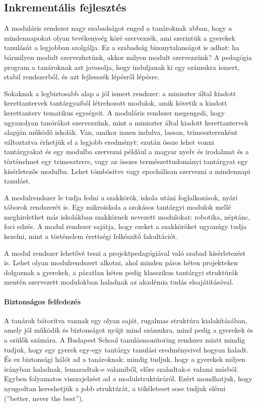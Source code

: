 \subsection{Inkrementális fejlesztés}
A moduláris rendszer nagy szabadságot enged a tanároknak abban, hogy a mindennapokat olyan tevékenység köré szervezzék, ami szerintük a gyerekek tanulását a legjobban szolgálja. Ez a szabadság bizonytalanságot is adhat: ha bármilyen modult szervezhetünk, akkor milyen modult szervezzünk? A pedagógia program a tanároknak azt javasolja, hogy induljanak ki egy számukra ismert, stabil rendszerből, és azt fejlesszék lépésről lépésre.

Sokaknak a legbiztosabb alap a jól ismert rendszer: a miniszter által kiadott kerettantervek tantárgyaiból létrehozott modulok, amik követik a kiadott kerettanterv tematikus egységeit. A moduláris rendszer megengedi, hogy ugyanolyan tanórákat szervezzünk, mint a miniszter által kiadott kerettantervek alapján működő iskolák. Van, amikor innen indulva, lassan, trimeszterenként változtatva érhetjük el a legjobb eredményt: ezután össze lehet vonni tantárgyakat és egy modulba szervezni például a magyar nyelv és irodalmat és a történelmet egy trimeszterre, vagy az összes természettudományi tantárgyat egy kísérletezős modulba. Lehet tömbösítve vagy epochálisan szervezni a mindennapi tanulást.

A modulrendszer le tudja fedni a szakkörök, iskola utáni foglalkozások, nyári táborok rendszerét is. Egy mikroiskola a szokásos tantárgyi modulok mellé meghirdethet más iskolákban szakkörnek nevezett modulokat: robotika, néptánc, foci edzés. A modul rendszer sajátja, hogy ezeket a szakköröket ugyanúgy tudja kezelni, mint a történelem érettségi felkészítő fakultációt.

A modul rendszer lehetővé teszi a projektpedagógiával való szabad kísérletezést is. Lehet olyan modulrendszert alkotni, ahol minden páros héten projekteken dolgoznak a gyerekek, a páratlan héten pedig klasszikus tantárgyi struktúrák mentén szervezett modulokban haladnak az akadémia tudás elsajátításával.

\paragraph{Biztonságos felfedezés}
A tanárok bátorítva vannak egy olyan saját, rugalmas struktúra kialakításában, amely jól működik és biztonságot nyújt mind számukra, mind pedig a gyerekek és a szülők számára. A Budapest School tanulásmonitoring rendszer miatt mindig tudjuk, hogy egy gyerek egy-egy tantárgy tanulási eredményeivel hogyan haladt. És ez biztonsági hálót ad a tanároknak: mindig tudjuk, hogy a gyerekek milyen irányban haladnak, lemaradtak-e valamiből, előre szaladtak-e valami másból. Egyben folyamatos visszajelzést ad a modulstruktúráról. Ezért mondhatjuk, hogy nyugodtan kereshetjük a jobb struktúrát, a tökéleteset sose tudjuk elérni (''better, never the best'').